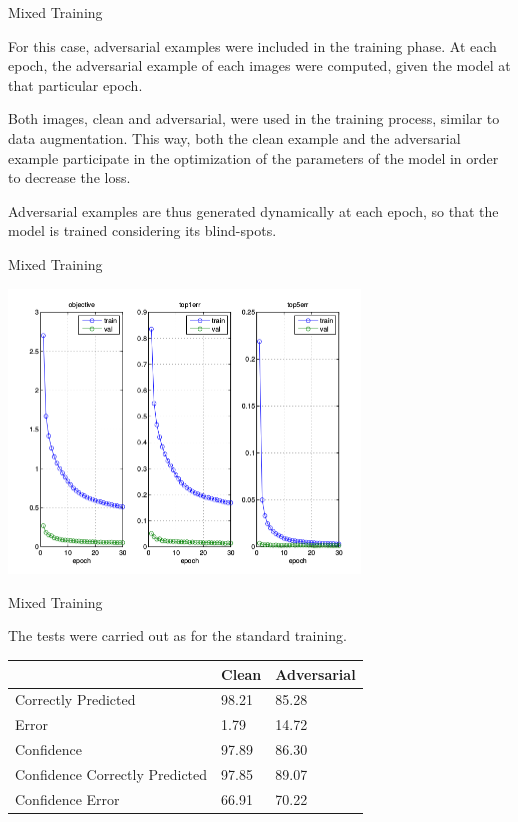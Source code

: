 \begin{tframe}{Mixed Training}

For this case, adversarial examples were included in the training phase. At each epoch, the adversarial example of each images were computed, given the model at that particular epoch. 

\vspace{0.1in}

Both images, clean and adversarial, were used in the training process, similar to data augmentation. This way, both the clean example and the adversarial example participate in the optimization of the parameters of the model in order to decrease the loss.

\vspace{0.1in}

Adversarial examples are thus generated dynamically at each epoch, so that the model is trained considering its blind-spots.

\end{tframe}

\begin{tframe}{Mixed Training}

\begin{center}
  \includegraphics[width=0.7\textwidth]{img/train-mix.png}
	\label{train-mix} 
\end{center}

\end{tframe}

\begin{tframe}{Mixed Training}

The tests were carried out as for the standard training.

\begin{table}[h]
\centering
\begin{tabular}{@{}lll@{}}
\toprule
                               & Clean & Adversarial \\ \midrule
Correctly Predicted            & 98.21 & 85.28       \\
Error                          & 1.79  & 14.72       \\
Confidence                     & 97.89 & 86.30       \\
Confidence Correctly Predicted & 97.85 & 89.07       \\
Confidence Error               & 66.91 & 70.22       \\ \bottomrule
\end{tabular}
\end{table}

\end{tframe}